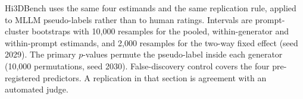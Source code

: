 Hi3DBench uses the same four estimands and the same replication rule, applied to MLLM pseudo-labels rather than to human ratings.
Intervals are prompt-cluster bootstraps with 10{,}000 resamples for the pooled, within-generator and within-prompt estimands, and 2{,}000 resamples for the two-way fixed effect (seed 2029).
The primary \(p\)-values permute the pseudo-label inside each generator (10{,}000 permutations, seed 2030).
False-discovery control covers the four pre-registered predictors.
A replication in that section is agreement with an automated judge.
